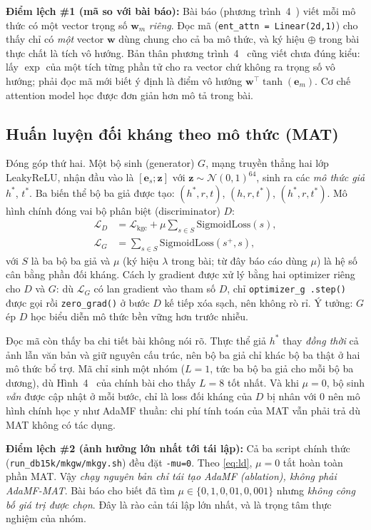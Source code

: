 \documentclass[conference]{IEEEtran}
\renewcommand{\hl}[1]{#1}
\begin{document}
\textbf{Điểm lệch \#1 (mã so với bài báo):} Bài báo (phương trình~4~\cite{adamfmat}) viết mỗi mô thức có một
vector trọng số $\mathbf{w}_m$ \emph{riêng}. Đọc mã (\texttt{ent\_attn =
Linear(2d,1)}) cho thấy chỉ có \emph{một} vector $\mathbf{w}$ dùng chung cho cả
ba mô thức, và ký hiệu $\oplus$ trong bài thực chất là tích vô hướng. Bản thân phương trình~4~\cite{adamfmat} cũng
viết chưa đúng kiểu: lấy $\exp$ của một tích từng phần tử cho ra vector chứ không ra trọng số
vô hướng; phải đọc mã mới biết ý định là điểm vô hướng $\mathbf{w}^\top\tanh(\mathbf{e}_m)$.
\hl{Cơ chế} attention model học được đơn giản hơn mô tả trong bài.

\subsection{Huấn luyện đối kháng theo mô thức (MAT)}
Đóng góp thứ hai. Một bộ sinh (generator) $G$, mạng truyền thẳng hai lớp
LeakyReLU, nhận đầu vào là $[\mathbf{e}_s; \mathbf{z}]$ với $\mathbf{z}\sim
\mathcal{N}(0,1)^{64}$, sinh ra các \emph{mô thức giả} $h^*$, $t^*$. Ba biến
thể bộ ba giả được tạo: $(h^*,r,t)$, $(h,r,t^*)$, $(h^*,r,t^*)$. Mô hình chính
đóng vai bộ phân biệt (discriminator) $D$:
\begin{align}
  \mathcal{L}_D &= \mathcal{L}_{\text{kgc}}
     + \mu \sum_{s\in S} \mathrm{SigmoidLoss}(s), \label{eq:ld}\\
  \mathcal{L}_G &= \sum_{s\in S} \mathrm{SigmoidLoss}(s^{+}, s),
\end{align}
với $S$ là ba bộ ba giả và $\mu$ (ký hiệu $\lambda$ trong bài; từ đây báo cáo dùng $\mu$) là hệ số
cân bằng phần đối kháng. Cách ly gradient được xử lý bằng hai optimizer riêng cho $D$ và
$G$: dù $\mathcal{L}_G$ có lan gradient vào tham số $D$, chỉ \texttt{optimizer\_g
.step()} được gọi rồi \texttt{zero\_grad()} ở bước $D$ kế tiếp xóa sạch, nên không
rò rỉ. Ý tưởng: $G$ ép $D$ học biểu diễn mô thức bền vững hơn trước nhiễu.

Đọc mã còn thấy ba chi tiết bài không nói rõ. Thực thể giả $h^*$ thay \emph{đồng thời} cả ảnh
lẫn văn bản và giữ nguyên cấu trúc, nên bộ ba giả chỉ khác bộ ba thật ở hai mô thức bổ trợ. Mã
chỉ sinh một nhóm ($L=1$, tức ba bộ ba giả cho mỗi bộ ba dương), dù Hình~4~\cite{adamfmat} của chính bài cho
thấy $L=8$ tốt nhất. Và khi $\mu=0$, bộ sinh \emph{vẫn} được cập nhật ở mỗi bước, chỉ là loss
đối kháng của $D$ bị nhân với 0 nên mô hình chính học y như AdaMF thuần: chi phí tính toán của
MAT vẫn phải trả dù MAT không có tác dụng.

\textbf{Điểm lệch \#2 (ảnh hưởng lớn nhất tới tái lập):} Cả ba script chính thức
(\texttt{run\_db15k/mkgw/mkgy.sh}) đều đặt \texttt{-mu=0}. Theo
\eqref{eq:ld}, $\mu=0$ tắt hoàn toàn phần MAT. Vậy \emph{chạy nguyên bản chỉ tái
tạo AdaMF (ablation), không phải AdaMF-MAT}. Bài báo cho biết đã tìm $\mu \in
\{0{,}1, 0{,}01, 0{,}001\}$ nhưng \emph{không công bố giá trị được chọn}. Đây là rào
cản tái lập lớn nhất, và là trọng tâm thực nghiệm của nhóm.
\end{document}
